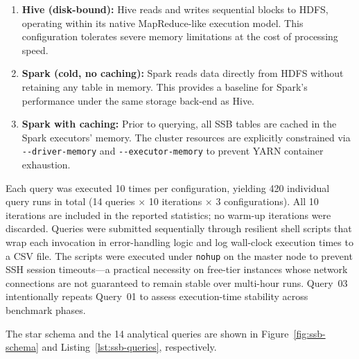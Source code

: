 \begin{enumerate}
    \item \textbf{Hive (disk-bound):} Hive reads and writes sequential blocks
    to HDFS, operating within its native MapReduce-like execution model. This
    configuration tolerates severe memory limitations at the cost of processing
    speed.
    \item \textbf{Spark (cold, no caching):} Spark reads data directly from
    HDFS without retaining any table in memory. This provides a baseline for
    Spark's performance under the same storage back-end as Hive.
    \item \textbf{Spark with caching:} Prior to querying, all SSB tables are
    cached in the Spark executors' memory. The cluster resources are explicitly
    constrained via \texttt{-{}-driver-memory} and \texttt{-{}-executor-memory}
    to prevent YARN container exhaustion.
\end{enumerate}

Each query was executed 10 times per configuration, yielding 420 individual
query runs in total (14 queries $\times$ 10 iterations $\times$ 3
configurations). All 10 iterations are included in the reported statistics; no
warm-up iterations were discarded.
Queries were submitted sequentially through resilient shell scripts that wrap
each invocation in error-handling logic and log wall-clock execution times to a
CSV file. The scripts were executed under \texttt{nohup} on the master node to
prevent SSH session timeouts---a practical necessity on free-tier instances whose
network connections are not guaranteed to remain stable over multi-hour runs.
Query~03 intentionally repeats Query~01 to assess execution-time stability
across benchmark phases.

The star schema and the 14 analytical queries are shown in
Figure~\ref{fig:ssb-schema} and Listing~\ref{lst:ssb-queries}, respectively.

